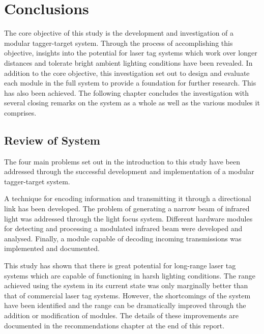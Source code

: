 \chapter{Conclusions}
\label{ch_conclusions}



The core objective of this study is the development and investigation of a modular tagger-target system. Through the process of accomplishing this objective, insights into the potential for laser tag systems which work over longer distances and tolerate bright ambient lighting conditions have been revealed.
In addition to the core objective, this investigation set out to design and evaluate each module in the full system to provide a foundation for further research. This has also been achieved. The following chapter concludes the investigation with several closing remarks on the system as a whole as well as the various modules it comprises.

\section{Review of System}


The four main problems set out in the introduction to this study have been addressed through the successful development and implementation of a modular tagger-target system.

A technique for encoding information and transmitting it through a directional link has been developed. The problem of generating a narrow beam of infrared light was addressed through the light focus system. Different hardware modules for detecting and processing a modulated infrared beam were developed and analysed. Finally, a module capable of decoding incoming transmissions was implemented and documented.

This study has shown that there is great potential for long-range laser tag systems which are capable of functioning in harsh lighting conditions. The range achieved using the system in its current state was only marginally better than that of commercial laser tag systems. However, the shortcomings of the system have been identified and the range can be dramatically improved through the addition or modification of modules. The details of these improvements are documented in the recommendations chapter at the end of this report.

